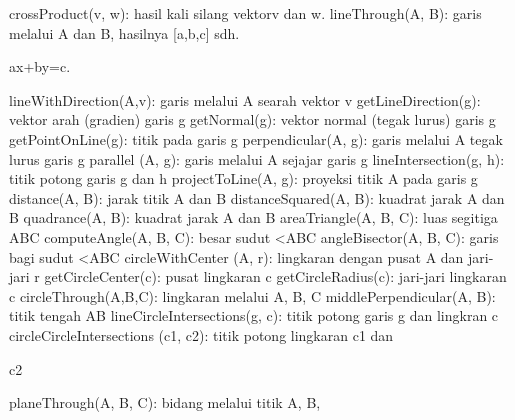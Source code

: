\documentclass[a4paper,10pt]{article}
\begin{document}
\begin{eulernotebook}
\begin{eulercomment}
\begin{eulercomment}
\begin{eulercomment}
\begin{eulercomment}
\begin{eulercomment}
\begin{eulercomment}
\begin{eulercomment}
\begin{eulercomment}
\begin{eulercomment}
\begin{eulercomment}
\begin{eulercomment}
\begin{eulercomment}
\begin{eulercomment}
\begin{eulercomment}
\begin{eulercomment}
\begin{eulercomment}
\begin{eulercomment}
\begin{eulercomment}
\begin{eulercomment}
\begin{eulercomment}
\begin{eulercomment}
\begin{eulercomment}
\begin{eulercomment}
\begin{eulercomment}
\begin{eulercomment}
\begin{eulercomment}
\begin{eulercomment}
\begin{eulercomment}
\begin{eulercomment}
\begin{eulercomment}
\begin{eulercomment}
\begin{eulercomment}
\begin{eulercomment}
\begin{eulercomment}
\begin{eulercomment}
\begin{eulercomment}
\begin{eulercomment}
\begin{eulercomment}
\begin{eulercomment}
\begin{eulercomment}
\begin{eulercomment}
\begin{eulercomment}
\begin{eulercomment}
\begin{eulercomment}
\begin{eulercomment}
\begin{eulercomment}
\begin{eulercomment}
\begin{eulercomment}
\begin{eulercomment}
\begin{eulercomment}
\begin{eulercomment}
\begin{eulercomment}
\begin{eulercomment}
\begin{eulercomment}
\begin{eulercomment}
\begin{eulercomment}
\begin{eulercomment}
\begin{eulercomment}
\begin{eulercomment}
\begin{eulercomment}
\begin{eulercomment}
\begin{eulercomment}
\begin{eulerttcomment}
crossProduct(v, w): hasil kali silang vektorv dan w.
  lineThrough(A, B): garis melalui A dan B, hasilnya [a,b,c] sdh.
\end{eulerttcomment}
\begin{eulercomment}
ax+by=c.\\
\end{eulercomment}
\begin{eulerttcomment}
  lineWithDirection(A,v): garis melalui A searah vektor v
  getLineDirection(g): vektor arah (gradien) garis g
  getNormal(g): vektor normal (tegak lurus) garis g
  getPointOnLine(g):  titik pada garis g
  perpendicular(A, g):  garis melalui A tegak lurus garis g
  parallel (A, g):  garis melalui A sejajar garis g
  lineIntersection(g, h):  titik potong garis g dan h
  projectToLine(A, g):   proyeksi titik A pada garis g
  distance(A, B):  jarak titik A dan B
  distanceSquared(A, B):  kuadrat jarak A dan B
  quadrance(A, B): kuadrat jarak A dan B
  areaTriangle(A, B, C):  luas segitiga ABC
  computeAngle(A, B, C):   besar sudut <ABC
  angleBisector(A, B, C): garis bagi sudut <ABC
  circleWithCenter (A, r): lingkaran dengan pusat A dan jari-jari r
  getCircleCenter(c):  pusat lingkaran c
  getCircleRadius(c):  jari-jari lingkaran c
  circleThrough(A,B,C):  lingkaran melalui A, B, C
  middlePerpendicular(A, B): titik tengah AB
  lineCircleIntersections(g, c): titik potong garis g dan lingkran c
  circleCircleIntersections (c1, c2):  titik potong lingkaran c1 dan
\end{eulerttcomment}
\begin{eulercomment}
c2\\
\end{eulercomment}
\begin{eulerttcomment}
  planeThrough(A, B, C):  bidang melalui titik A, B, 
\end{eulerttcomment}
\end{eulercomment}
\end{eulercomment}
\end{eulercomment}
\end{eulercomment}
\end{eulercomment}
\end{eulercomment}
\end{eulercomment}
\end{eulercomment}
\end{eulercomment}
\end{eulercomment}
\end{eulercomment}
\end{eulercomment}
\end{eulercomment}
\end{eulercomment}
\end{eulercomment}
\end{eulercomment}
\end{eulercomment}
\end{eulercomment}
\end{eulercomment}
\end{eulercomment}
\end{eulercomment}
\end{eulercomment}
\end{eulercomment}
\end{eulercomment}
\end{eulercomment}
\end{eulercomment}
\end{eulercomment}
\end{eulercomment}
\end{eulercomment}
\end{eulercomment}
\end{eulercomment}
\end{eulercomment}
\end{eulercomment}
\end{eulercomment}
\end{eulercomment}
\end{eulercomment}
\end{eulercomment}
\end{eulercomment}
\end{eulercomment}
\end{eulercomment}
\end{eulercomment}
\end{eulercomment}
\end{eulercomment}
\end{eulercomment}
\end{eulercomment}
\end{eulercomment}
\end{eulercomment}
\end{eulercomment}
\end{eulercomment}
\end{eulercomment}
\end{eulercomment}
\end{eulercomment}
\end{eulercomment}
\end{eulercomment}
\end{eulercomment}
\end{eulercomment}
\end{eulercomment}
\end{eulercomment}
\end{eulercomment}
\end{eulercomment}
\end{eulercomment}
\end{eulercomment}
\end{eulernotebook}
\end{document}
